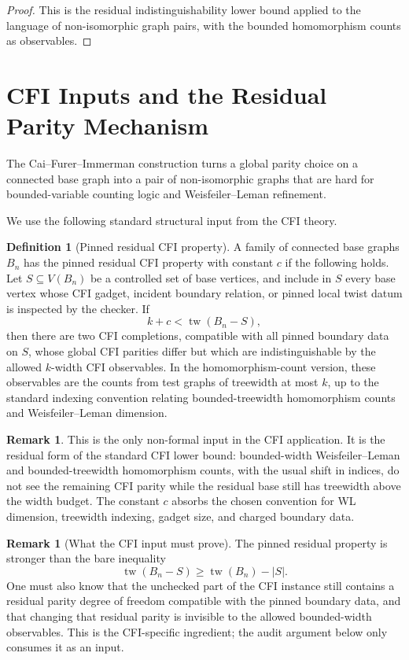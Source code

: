 \documentclass[11pt]{article}
\theoremstyle{definition}
\newtheorem{definition}[theorem]{Definition}
\newtheorem{remark}[theorem]{Remark}
\DeclareMathOperator{\tw}{tw}
\begin{document}
\begin{proof}
This is the residual indistinguishability lower bound applied to the language of non-isomorphic graph pairs, with the bounded homomorphism counts as observables.
\end{proof}

\section{CFI Inputs and the Residual Parity Mechanism}

The Cai--Furer--Immerman construction turns a global parity choice on a connected base graph into a pair of non-isomorphic graphs that are hard for bounded-variable counting logic and Weisfeiler--Leman refinement.

We use the following standard structural input from the CFI theory.

\begin{definition}[Pinned residual CFI property]
A family of connected base graphs \(B_n\) has the pinned residual CFI property with constant \(c\) if the following holds. Let \(S\subseteq V(B_n)\) be a controlled set of base vertices, and include in \(S\) every base vertex whose CFI gadget, incident boundary relation, or pinned local twist datum is inspected by the checker. If
\[
k+c<\tw(B_n-S),
\]
then there are two CFI completions, compatible with all pinned boundary data on \(S\), whose global CFI parities differ but which are indistinguishable by the allowed \(k\)-width CFI observables. In the homomorphism-count version, these observables are the counts from test graphs of treewidth at most \(k\), up to the standard indexing convention relating bounded-treewidth homomorphism counts and Weisfeiler--Leman dimension.
\end{definition}

\begin{remark}
This is the only non-formal input in the CFI application. It is the residual form of the standard CFI lower bound: bounded-width Weisfeiler--Leman and bounded-treewidth homomorphism counts, with the usual shift in indices, do not see the remaining CFI parity while the residual base still has treewidth above the width budget. The constant \(c\) absorbs the chosen convention for WL dimension, treewidth indexing, gadget size, and charged boundary data.
\end{remark}

\begin{remark}[What the CFI input must prove]
The pinned residual property is stronger than the bare inequality
\[
\tw(B_n-S)\geq \tw(B_n)-|S|.
\]
One must also know that the unchecked part of the CFI instance still contains a residual parity degree of freedom compatible with the pinned boundary data, and that changing that residual parity is invisible to the allowed bounded-width observables. This is the CFI-specific ingredient; the audit argument below only consumes it as an input.
\end{remark}
\end{document}
